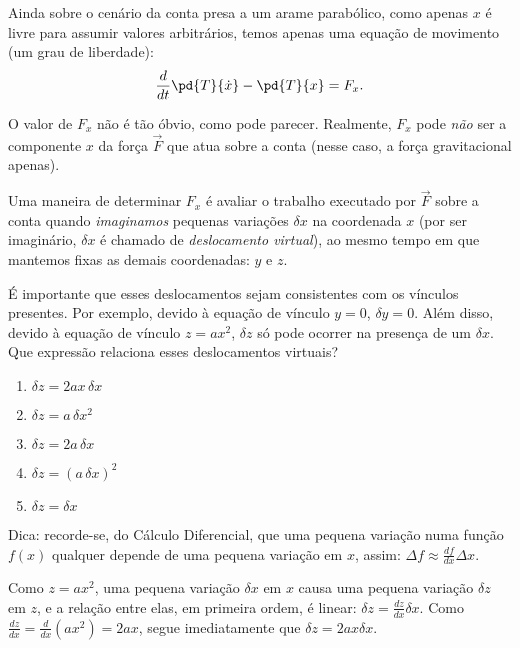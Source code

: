 \begin{question}
    Ainda sobre o cenário da conta presa a um arame parabólico, como apenas $x$ é livre para assumir valores arbitrários, temos apenas uma equação de movimento (um grau de liberdade):
    \begin{equation}
      \frac{d}{dt}\pd{T}{\dot x} - \pd{T}{x} = F_{x}.
    \end{equation}

    O valor de $F_x$ não é tão óbvio, como pode parecer.
    Realmente, $F_x$ pode \emph{não} ser a componente $x$ da força $\vec F$ que atua sobre a conta (nesse caso, a força gravitacional apenas).
    
    Uma maneira de determinar $F_x$ é avaliar o trabalho executado por $\vec F$ sobre a conta quando \emph{imaginamos} pequenas variações $\delta x$ na coordenada $x$ (por ser imaginário, $\delta x$ é chamado de \emph{deslocamento virtual}), ao mesmo tempo em que mantemos fixas as demais coordenadas: $y$ e $z$.

    É importante que esses deslocamentos sejam consistentes com os vínculos presentes.
    Por exemplo, devido à equação de vínculo $y = 0$, $\delta y = 0$.
    Além disso, devido à equação de vínculo $z = ax^2$, $\delta z$ só pode ocorrer na presença de um $\delta x$.
    Que expressão relaciona esses deslocamentos virtuais?
    \begin{enumerate}
      \item $\delta z = 2a x \,\delta x$ \rightanswer
      \item $\delta z = a \,\delta x^2$
      \item $\delta z = 2a \,\delta x$
      \item $\delta z = (a\, \delta x)^2$
      \item $\delta z = \delta x$
    \end{enumerate}

    \bigskip
    \begin{compactdesc}
      \item[Dica:] recorde-se, do Cálculo Diferencial, que uma pequena variação numa função $f(x)$ qualquer depende de uma pequena variação em $x$, assim: $\Delta f \approx \frac{df}{dx} \Delta x$.
    \end{compactdesc}

    \begin{solution}
      Como $z = ax^2$, uma pequena variação $\delta x$ em $x$ causa uma pequena variação $\delta z$ em $z$, e a relação entre elas, em primeira ordem, é linear: $\delta z = \frac{dz}{dx} \delta x$.
      Como $\frac{dz}{dx} = \frac{d}{dx}(ax^2) = 2ax$, segue imediatamente que $\delta z = 2a x \delta x$.
    \end{solution}
\end{question}